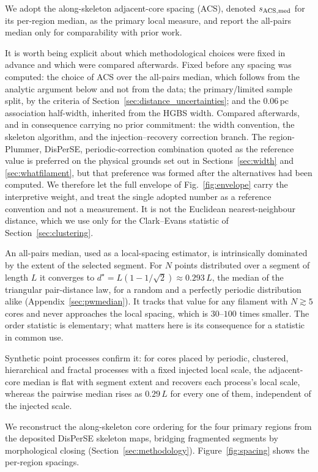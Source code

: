 \documentclass[usenatbib,twoside,twocolumn]{mnras}
\begin{document}
We adopt the along-skeleton adjacent-core spacing (ACS), denoted $s_{\rm ACS,med}$ for its per-region median, as the primary local measure, and report the all-pairs median only for comparability with prior work.

It is worth being explicit about which methodological choices were fixed in advance and which were compared afterwards. Fixed before any spacing was computed: the choice of ACS over the all-pairs median, which follows from the analytic argument below and not from the data; the primary/limited sample split, by the criteria of Section~\ref{sec:distance_uncertainties}; and the $0.06$\,pc association half-width, inherited from the HGBS width. Compared afterwards, and in consequence carrying no prior commitment: the width convention, the skeleton algorithm, and the injection--recovery correction branch. The region-Plummer, DisPerSE, periodic-correction combination quoted as the reference value is preferred on the physical grounds set out in Sections~\ref{sec:width} and \ref{sec:whatfilament}, but that preference was formed after the alternatives had been computed. We therefore let the full envelope of Fig.~\ref{fig:envelope} carry the interpretive weight, and treat the single adopted number as a reference convention and not a measurement. It is not the Euclidean nearest-neighbour distance, which we use only for the Clark--Evans statistic of Section~\ref{sec:clustering}.

An all-pairs median, used as a local-spacing estimator, is intrinsically dominated by the extent of the selected segment. For $N$ points distributed over a segment of length $L$ it converges to $d^\star=L(1-1/\sqrt{2})\approx0.293\,L$, the median of the triangular pair-distance law, for a random and a perfectly periodic distribution alike (Appendix~\ref{sec:pwmedian}). It tracks that value for any filament with $N\gtrsim5$ cores and never approaches the local spacing, which is $30$--$100$ times smaller. The order statistic is elementary; what matters here is its consequence for a statistic in common use.

Synthetic point processes confirm it: for cores placed by periodic, clustered, hierarchical and fractal processes with a fixed injected local scale, the adjacent-core median is flat with segment extent and recovers each process's local scale, whereas the pairwise median rises as $0.29\,L$ for every one of them, independent of the injected scale.

We reconstruct the along-skeleton core ordering for the four primary regions from the deposited DisPerSE skeleton maps, bridging fragmented segments by morphological closing (Section~\ref{sec:methodology}). Figure~\ref{fig:spacing} shows the per-region spacings.
\end{document}
